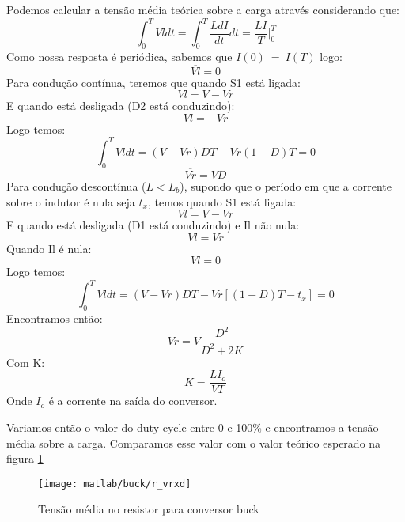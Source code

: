 \documentclass{article}
\begin{document}
Podemos calcular a tensão média teórica sobre a carga através considerando que:
\begin{equation}
\int_{0}^{T}Vl dt = \int_{0}^{T}\frac{LdI}{dt} dt = \frac{LI}{T}\bigg\rvert_0^T
\end{equation}
Como nossa resposta é periódica, sabemos que $I(0)\ =\ I(T)$ logo:
\begin{equation}
\overline{Vl} = 0
\end{equation}
Para condução contínua, teremos que quando S1 está ligada:
\begin{equation}
Vl = V - Vr
\end{equation}
E quando está desligada (D2 está conduzindo):
\begin{equation}
Vl = - Vr
\end{equation}
Logo temos:
\begin{equation}
\int_{0}^{T}Vl dt = (V-Vr)DT - Vr(1 - D)T = 0
\end{equation}
\begin{equation}
\overline{Vr} = VD
\end{equation}
Para condução descontínua ($L < L_b$), supondo que o período em que a corrente sobre o indutor é nula seja $t_x$, temos quando S1 está ligada:
\begin{equation}
Vl = V - Vr
\end{equation}
E quando está desligada (D1 está conduzindo) e Il não nula:
\begin{equation}
Vl = Vr
\end{equation}
Quando Il é nula:
\begin{equation}
Vl = 0
\end{equation}
Logo temos:
\begin{equation}
\int_{0}^{T}Vl dt = (V - Vr)DT - Vr[(1 - D)T - t_x] = 0
\end{equation}
Encontramos então:
\begin{equation}
\overline{Vr} = V\frac{D^2}{D^2 + 2K}
\end{equation}
Com K:
\begin{equation}
K = \frac{LI_o}{VT}
\end{equation}
Onde $I_o$ é a corrente na saída do conversor.

Variamos então o valor do duty-cycle entre 0 e 100\% e encontramos a tensão média sobre a carga. Comparamos esse valor com o valor teórico esperado na figura \ref{fig:buvrxd}
\begin{figure}[H]
	\centering
	\texttt{[image: matlab/buck/r\_vrxd]}
	\caption{Tensão média no resistor para conversor buck}
	\label{fig:buvrxd}
\end{figure}
\end{document}
